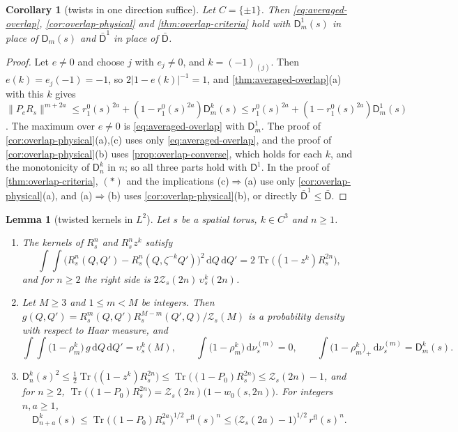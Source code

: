 \documentclass[11pt,a4paper]{amsart}
\newtheorem{lemma}[theorem]{Lemma}
\newtheorem{corollary}[theorem]{Corollary}
\theoremstyle{definition}
\theoremstyle{remark}
\numberwithin{equation}{section}
\DeclareMathOperator{\Tr}{Tr}        %
\newcommand{\norm}[1]{\lVert #1\rVert}     %
\newcommand{\abs}[1]{\lvert #1\rvert}      %
\newcommand{\dd}{\,\mathrm{d}}             %
\newcommand{\TT}{\mathbb{T}}               %
\newcommand{\Zc}{\mathcal{Z}}              %
\newcommand{\Zs}[2]{\Zc_{#1}(#2)}          %
\begin{document}
\begin{corollary}[twists in one direction suffice]\label{cor:single-twist}
Let $C=\{\pm1\}$. Then \eqref{eq:averaged-overlap}, \cref{cor:overlap-physical} and \cref{thm:overlap-criteria} hold with $\mathsf D^1_m(s)$ in place of $\mathsf D_m(s)$ and $\bar{\mathsf D}^1$ in place of $\bar{\mathsf D}$.
\end{corollary}

\begin{proof}
Let $e\ne0$ and choose $j$ with $e_j\ne0$, and $k=(-1)_{(j)}$. Then $e(k)=e_j(-1)=-1$, so $2\abs{1-e(k)}^{-1}=1$, and \cref{thm:averaged-overlap}\textup{(a)} with this $k$ gives $\norm{P_eR_s}^{m+2a}\le r_1^0(s)^{2a}+(1-r_1^0(s)^{2a})\mathsf D^k_m(s)\le r_1^0(s)^{2a}+(1-r_1^0(s)^{2a})\mathsf D^1_m(s)$. The maximum over $e\ne0$ is \eqref{eq:averaged-overlap} with $\mathsf D^1_m$. The proof of \cref{cor:overlap-physical}\textup{(a),(c)} uses only \eqref{eq:averaged-overlap}, and the proof of \cref{cor:overlap-physical}\textup{(b)} uses \cref{prop:overlap-converse}, which holds for each $k$, and the monotonicity of $\mathsf D^k_n$ in $n$; so all three parts hold with $\mathsf D^1$. In the proof of \cref{thm:overlap-criteria}, $(\ast)$ and the implications (c)$\Rightarrow$(a) use only \cref{cor:overlap-physical}\textup{(a)}, and (a)$\Rightarrow$(b) uses \cref{cor:overlap-physical}\textup{(b)}, or directly $\bar{\mathsf D}^1\le\bar{\mathsf D}$.
\end{proof}

\begin{lemma}[twisted kernels in $L^2$]\label{lem:twist-L2}
Let $s$ be a spatial torus, $k\in C^3$ and $n\ge1$.
\begin{enumerate}[label=\textup{(\alph*)},leftmargin=*]
\item The kernels of $R_s^n$ and $R_s^nz^k$ satisfy
\begin{equation}\label{eq:twist-L2}
\int\!\!\int\bigl(R_s^n(Q,Q')-R_s^n(Q,\zeta^{-k}Q')\bigr)^2\dd Q\dd Q'=2\Tr\bigl((1-z^k)R_s^{2n}\bigr),
\end{equation}
and for $n\ge2$ the right side is $2\Zs{s}{2n}\,\upsilon^k_s(2n)$.
\item Let $M\ge3$ and $1\le m<M$ be integers. Then $g(Q,Q')=R_s^m(Q,Q')R_s^{M-m}(Q',Q)/\Zs{s}{M}$ is a probability density with respect to Haar measure, and
\begin{equation}\label{eq:thermal-pair}
\int\!\!\int\bigl(1-\rho^k_m\bigr)\,g\dd Q\dd Q'=\upsilon^k_s(M),\qquad \int\bigl(1-\rho^k_m\bigr)\dd\nu^{(m)}_s=0,\qquad \int\bigl(1-\rho^k_m\bigr)_+\dd\nu^{(m)}_s=\mathsf D^k_m(s).
\end{equation}
\item $\mathsf D^k_n(s)^2\le\frac12\Tr\bigl((1-z^k)R_s^{2n}\bigr)\le\Tr\bigl((1-P_0)R_s^{2n}\bigr)\le\Zs{s}{2n}-1$, and for $n\ge2$, $\Tr\bigl((1-P_0)R_s^{2n}\bigr)=\Zs{s}{2n}\bigl(1-w_0(s,2n)\bigr)$. For integers $n,a\ge1$,
\[
\mathsf D^k_{n+a}(s)\le\Tr\bigl((1-P_0)R_s^{2a}\bigr)^{1/2}\,r^{\mathrm{fl}}(s)^n\le\bigl(\Zs{s}{2a}-1\bigr)^{1/2}\,r^{\mathrm{fl}}(s)^n .
\]
\end{enumerate}
\end{lemma}
\end{document}
